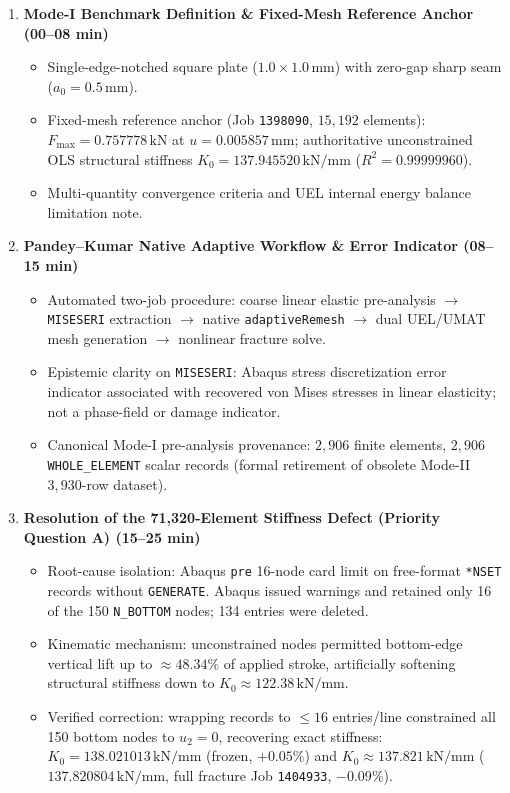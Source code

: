 \documentclass[10pt,a4paper]{article}
\begin{document}
\begin{enumerate}[label=\textbf{\arabic*.},leftmargin=5mm,itemsep=3pt,topsep=2pt]
  \item \textbf{Mode-I Benchmark Definition \& Fixed-Mesh Reference Anchor (00--08 min)}
  \begin{itemize}[itemsep=1pt,topsep=1pt,leftmargin=4mm]
    \small
    \item Single-edge-notched square plate ($1.0 \times 1.0\,\mathrm{mm}$) with zero-gap sharp seam ($a_0 = 0.5\,\mathrm{mm}$).
    \item Fixed-mesh reference anchor (Job \texttt{1398090}, $15{,}192$ elements): $F_{\max} = 0.757778\,\mathrm{kN}$ at $u = 0.005857\,\mathrm{mm}$; authoritative unconstrained OLS structural stiffness $K_0 = 137.945520\,\mathrm{kN/mm}$ ($R^2 = 0.99999960$).
    \item Multi-quantity convergence criteria and UEL internal energy balance limitation note.
  \end{itemize}

  \item \textbf{Pandey--Kumar Native Adaptive Workflow \& Error Indicator (08--15 min)}
  \begin{itemize}[itemsep=1pt,topsep=1pt,leftmargin=4mm]
    \small
    \item Automated two-job procedure: coarse linear elastic pre-analysis $\to$ \texttt{MISESERI} extraction $\to$ native \texttt{adaptiveRemesh} $\to$ dual UEL/UMAT mesh generation $\to$ nonlinear fracture solve.
    \item Epistemic clarity on \texttt{MISESERI}: Abaqus stress discretization error indicator associated with recovered von Mises stresses in linear elasticity; not a phase-field or damage indicator.
    \item Canonical Mode-I pre-analysis provenance: $2{,}906$ finite elements, $2{,}906$ \texttt{WHOLE\_ELEMENT} scalar records (formal retirement of obsolete Mode-II $3{,}930$-row dataset).
  \end{itemize}

  \item \textbf{Resolution of the 71,320-Element Stiffness Defect (Priority Question A) (15--25 min)}
  \begin{itemize}[itemsep=1pt,topsep=1pt,leftmargin=4mm]
    \small
    \item Root-cause isolation: Abaqus \texttt{pre} 16-node card limit on free-format \texttt{*NSET} records without \texttt{GENERATE}. Abaqus issued warnings and retained only 16 of the 150 \texttt{N\_BOTTOM} nodes; 134 entries were deleted.
    \item Kinematic mechanism: unconstrained nodes permitted bottom-edge vertical lift up to $\approx 48.34\%$ of applied stroke, artificially softening structural stiffness down to $K_0 \approx 122.38\,\mathrm{kN/mm}$.
    \item Verified correction: wrapping records to $\le 16$ entries/line constrained all 150 bottom nodes to $u_2 = 0$, recovering exact stiffness: $K_0 = 138.021013\,\mathrm{kN/mm}$ (frozen, $+0.05\%$) and $K_0 \approx 137.821\,\mathrm{kN/mm}$ ($137.820804\,\mathrm{kN/mm}$, full fracture Job \texttt{1404933}, $-0.09\%$).
  \end{itemize}


\end{enumerate}
\end{document}
